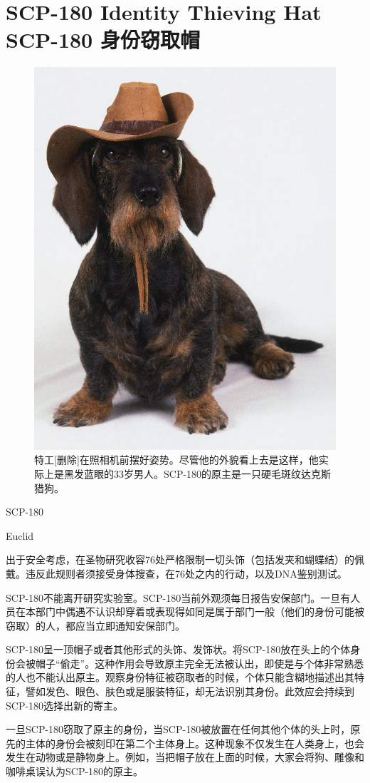 \chapter[SCP-180 身份窃取帽]{
    SCP-180 Identity Thieving Hat\\
    SCP-180 身份窃取帽
}

\label{chap:SCP-180}

\begin{figure}[H]
    \centering
    \includegraphics[width=0.5\linewidth]{images/SCP-180.jpg}
    \caption*{特工{[}删除]在照相机前摆好姿势。尽管他的外貌看上去是这样，他实际上是黑发蓝眼的33岁男人。SCP-180的原主是一只硬毛斑纹达克斯猎狗。}
\end{figure}

SCP-180

Euclid

出于安全考虑，在圣物研究收容76处严格限制一切头饰（包括发夹和蝴蝶结）的佩戴。违反此规则者须接受身体搜查，在76处之内的行动，以及DNA鉴别测试。

SCP-180不能离开研究实验室。SCP-180当前外观须每日报告安保部门。一旦有人员在本部门中偶遇不认识却穿着或表现得如同是属于部门一般（他们的身份可能被窃取）的人，都应当立即通知安保部门。

SCP-180呈一顶帽子或者其他形式的头饰、发饰状。将SCP-180放在头上的个体身份会被帽子“偷走”。这种作用会导致原主完全无法被认出，即使是与个体非常熟悉的人也不能认出原主。观察身份特征被窃取者的时候，个体只能含糊地描述出其特征，譬如发色、眼色、肤色或是服装特征，却无法识别其身份。此效应会持续到SCP-180选择出新的寄主。

一旦SCP-180窃取了原主的身份，当SCP-180被放置在任何其他个体的头上时，原先的主体的身份会被刻印在第二个主体身上。这种现象不仅发生在人类身上，也会发生在动物或是静物身上。例如，当把帽子放在上面的时候，大家会将狗、雕像和咖啡桌误认为SCP-180的原主。

